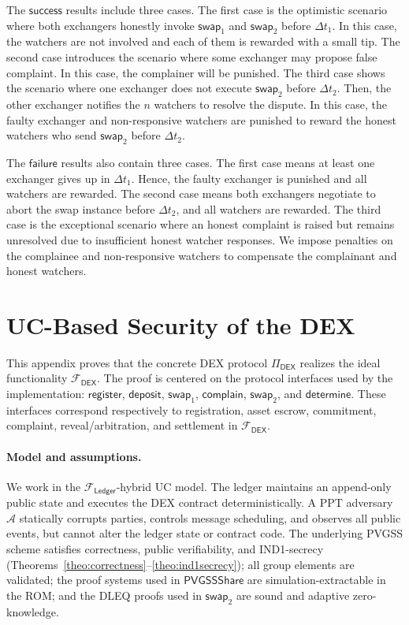 \documentclass[runningheads]{llncs}
\newcommand{\success}{\mathsf{success}}
\newcommand{\failure}{\mathsf{failure}}
\newcommand{\pvgssShare}{\mathsf{PVGSSShare}}
\begin{document}
The $\success$ results include three cases. The first case is the optimistic scenario where both exchangers honestly invoke $\mathsf{swap}_1$ and $\mathsf{swap}_2$ before $\Delta t_1$. In this case, the watchers are not involved and each of them is rewarded with a small tip.
The second case introduces the scenario where some exchanger may propose false complaint. In this case, the complainer will be punished.
The third case shows the scenario where one exchanger does not execute $\mathsf{swap}_2$ before $\Delta t_2$. Then, the other exchanger notifies the $n$ watchers to resolve the dispute. In this case, the faulty exchanger and non-responsive watchers are punished to reward the honest watchers who send $\mathsf{swap}_2$ before $\Delta t_2$.

The $\failure$ results also contain three cases. The first case means at least one exchanger gives up in $\Delta t_1$. Hence, the faulty exchanger is punished and all watchers are rewarded. The second case means both exchangers negotiate to abort the swap instance before $\Delta t_2$, and all watchers are rewarded. The third case is the exceptional scenario where an honest complaint is raised but remains unresolved due to insufficient honest watcher responses. We impose penalties on the complainee and non-responsive watchers to compensate the complainant and honest watchers.




\section{UC-Based Security of the DEX}
\label{sec:uc-dex-security}

This appendix proves that the concrete DEX protocol \(\Pi_{\mathsf{DEX}}\)
realizes the ideal functionality \(\mathcal{F}_{\mathsf{DEX}}\). The proof is
centered on the protocol interfaces used by the implementation:
\(\mathsf{register}\), \(\mathsf{deposit}\), \(\mathsf{swap}_1\),
\(\mathsf{complain}\), \(\mathsf{swap}_2\), and \(\mathsf{determine}\). These
interfaces correspond respectively to registration, asset escrow, commitment,
complaint, reveal/arbitration, and settlement in \(\mathcal{F}_{\mathsf{DEX}}\).

\paragraph{Model and assumptions.}
We work in the \(\mathcal{F}_{\mathsf{Ledger}}\)-hybrid UC model. The ledger
maintains an append-only public state and executes the DEX contract
deterministically. A PPT adversary \(\mathcal{A}\) statically corrupts parties,
controls message scheduling, and observes all public events, but cannot alter
the ledger state or contract code. The underlying PVGSS scheme satisfies
correctness, public verifiability, and IND1-secrecy
(Theorems~\ref{theo:correctness}--\ref{theo:ind1secrecy}); all group elements are
validated; the proof systems used in \(\pvgssShare\) are simulation-extractable
in the ROM; and the DLEQ proofs used in \(\mathsf{swap}_2\) are sound and
adaptive zero-knowledge.
\end{document}

